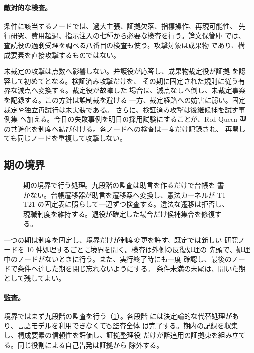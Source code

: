 \paragraph{敵対的な検査。}
条件に該当するノードでは、過大主張、証拠欠落、指標操作、再現可能性、
先行研究、費用超過、指示注入の七種から必要な検査を行う。論文保管庫
では、査読役の過剰受理を調べる八番目の検査も使う。攻撃対象は成果物
であり、構成要素を直接攻撃するものではない。

未裁定の攻撃は点数へ影響しない。弁護役が応答し、成果物裁定役が証拠
を認容して初めてとなる。検証済み攻撃だけを、
その期に固定された規則に従う有界な減点へ変換する。裁定役が故障した
場合は、減点なしへ倒し、未裁定事案を記録する。この方針は誤制裁を避ける
一方、裁定経路への妨害に弱い。固定裁定や独立再試行は未実装である。
さらに、検証済み攻撃は後継候補を試す事例集
へ加える。今日の失敗事例を明日の採用試験にすることが、Red Queen 型
の共進化を制度へ結び付ける。各ノードへの検査は一度だけ記録され、
再開しても同じノードを重複して攻撃しない。

\subsection{期の境界}\label{sec:rqgm:boundary}

\begin{figure}[t]
  \centering
  \resizebox{\columnwidth}{!}{}
  \caption{期の境界で行う処理。九段階の監査は助言を作るだけで台帳を
    書かない。台帳遷移器が助言を遷移案へ変換し、憲法カーネルが
    T1--T21 の固定表に照らして一辺ずつ検査する。違法な遷移は拒否し、
    現職制度を維持する。退役が確定した場合だけ候補集合を修復する。}
  \label{fig:rqgm-boundary}
\end{figure}

一つの期は制度を固定し、境界だけが制度変更を許す。既定では新しい
研究ノードを 10 件処理するごとに境界を開く。検査は外側の反復処理の
先頭で、処理中のノードがないときに行う。また、実行終了時にも一度
確認し、最後のノードで条件へ達した期を閉じ忘れないようにする。
条件未満の末尾は、開いた期として残してよい。

\paragraph{監査。}
境界ではまず九段階の監査を行う（\cref{fig:rqgm-boundary}）。各段階
には決定論的な代替処理があり、言語モデルを利用できなくても監査全体
は完了する。期内の記録を収集し、構成要素の信頼性を評価し、証拠整理役
だけが訴追用の証拠束を組み立てる。同じ役割による自己告発は証拠から
除外する。


